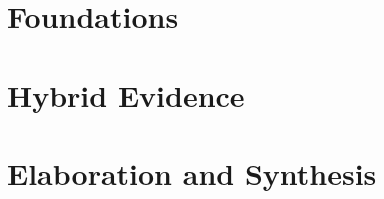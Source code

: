 \documentclass[11pt]{report}
\theoremstyle{definition}
\theoremstyle{plain}
\begin{document}
\tableofcontents
\clearpage
{}

\part{Foundations}






\part{Hybrid Evidence}






\part{Elaboration and Synthesis}







\appendix


\end{document}
